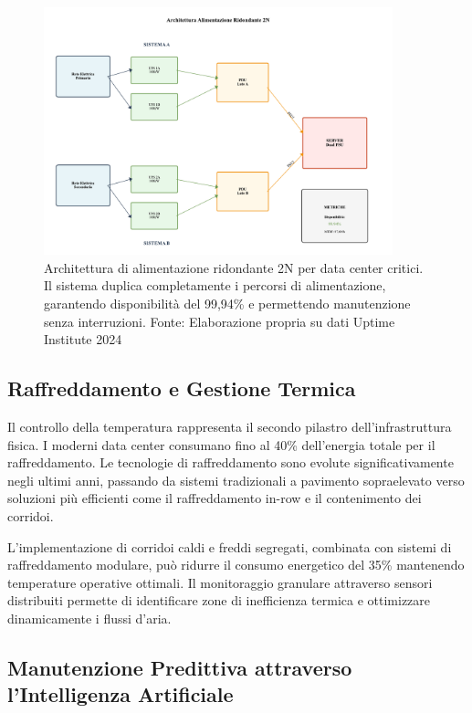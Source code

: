 \begin{figure}[htbp]
\centering
\includegraphics[width=0.9\textwidth]{thesis_figures/cap3/fig_3_1_power_architecture.pdf}
\caption{Architettura di alimentazione ridondante 2N per data center critici. Il sistema duplica completamente i percorsi di alimentazione, garantendo disponibilità del 99,94\% e permettendo manutenzione senza interruzioni. Fonte: Elaborazione propria su dati Uptime Institute 2024}
\label{fig:power_2n}
\end{figure}

\subsection{Raffreddamento e Gestione Termica}

Il controllo della temperatura rappresenta il secondo pilastro dell'infrastruttura fisica. I moderni data center consumano fino al 40\% dell'energia totale per il raffreddamento\autocite{ASHRAE2024}. Le tecnologie di raffreddamento sono evolute significativamente negli ultimi anni, passando da sistemi tradizionali a pavimento sopraelevato verso soluzioni più efficienti come il raffreddamento in-row e il contenimento dei corridoi.

L'implementazione di corridoi caldi e freddi segregati, combinata con sistemi di raffreddamento modulare, può ridurre il consumo energetico del 35\% mantenendo temperature operative ottimali. Il monitoraggio granulare attraverso sensori distribuiti permette di identificare zone di inefficienza termica e ottimizzare dinamicamente i flussi d'aria.

\subsection{Manutenzione Predittiva attraverso l'Intelligenza Artificiale}

